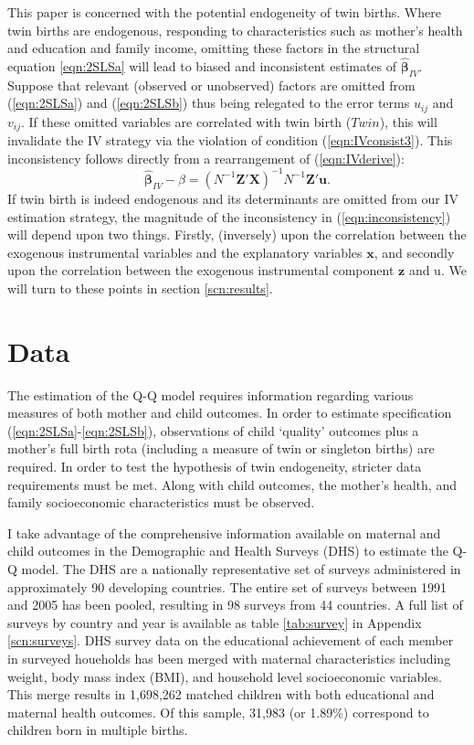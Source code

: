 \documentclass{article}[11pt,subeqn]
\newcommand{\vect}[1]{\mathbf{#1}}
\begin{document}
\begin{spacing}{1.5}
This paper is concerned 
with the potential endogeneity of twin births.  Where twin births are endogenous, responding to characteristics such as mother's 
health and education and family income, omitting these factors in the structural equation \ref{eqn:2SLSa} will lead to biased and 
inconsistent estimates of $\vect{\hat{\beta}}_{IV}$.  Suppose that relevant (observed or unobserved) factors are omitted from
(\ref{eqn:2SLSa}) and (\ref{eqn:2SLSb}) thus being relegated to the error terms $u_{ij}$ and $v_{ij}$.  If these omitted variables 
are correlated with twin birth ($Twin$), this will invalidate the IV strategy via the violation of condition (\ref{eqn:IVconsist3}).  This
inconsistency follows directly from a rearrangement of (\ref{eqn:IVderive}):
\begin{equation}
\label{eqn:inconsistency}
\vect{\hat{\beta}}_{IV}-\beta=(N^{-1}\vect{Z}'\vect{X})^{-1}N^{-1}\vect{Z}'\vect{u}.
\end{equation}
If twin birth is indeed endogenous and its determinants are omitted from our IV estimation strategy, the magnitude of the inconsistency in 
(\ref{eqn:inconsistency}) will depend upon two things.  Firstly, (inversely) upon the correlation between the exogenous instrumental
variables and the explanatory variables $\vect{x}$, and secondly upon the correlation between the exogenous instrumental component
$\vect{z}$ and u.  We will turn to these points in section \ref{scn:results}.

\section{Data}
\label{scn:data}
\vspace{-5mm}
The estimation of the Q-Q model requires information regarding various measures of both mother and child outcomes. In order to estimate 
specification (\ref{eqn:2SLSa}-\ref{eqn:2SLSb}), observations of child `quality' outcomes plus a mother's full birth rota (including a 
measure of twin or singleton births) are required.  In order to test the hypothesis of twin endogeneity, stricter data requirements 
must be met.  Along with child outcomes, the mother's health, and family socioeconomic characteristics must be observed.

I take advantage of the comprehensive information available on maternal and child outcomes in the Demographic and Health Surveys (DHS) 
to estimate the Q-Q model.  The DHS are a nationally representative set of surveys administered in approximately 90 developing countries.  
The entire set of surveys between 1991 and 2005 has been pooled, resulting in 98 surveys from 44 countries.  A full list of surveys by 
country and year is available as table \ref{tab:survey} in Appendix \ref{scn:surveys}.  DHS survey data on the educational achievement 
of each member in surveyed houeholds has been merged with maternal characteristics including weight, body mass index (BMI), and 
household level socioeconomic variables.  This merge results in 1,698,262 matched children with both educational and maternal health
outcomes.  Of this sample, 31,983 (or 1.89\%) correspond to children born in multiple births.


\end{spacing}
\end{document}
